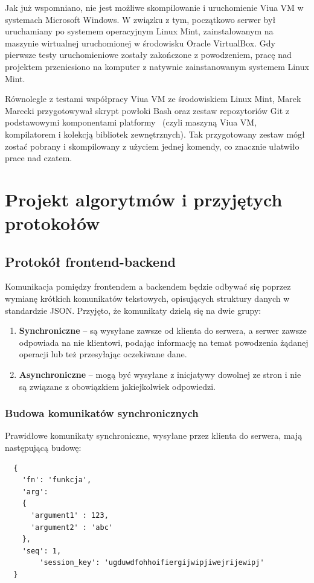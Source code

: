 Jak już wspomniano, nie jest możliwe skompilowanie i uruchomienie Viua
VM w systemach Microsoft Windows. W związku z tym, początkowo serwer był
uruchamiany po systemem operacyjnym Linux Mint, zainstalowanym na maszynie
wirtualnej uruchomionej w środowisku Oracle VirtualBox. Gdy pierwsze testy
uruchomieniowe zostały zakończone z powodzeniem, pracę nad projektem
przeniesiono na komputer z natywnie zainstanowanym systemem Linux Mint.

Równolegle z testami współpracy Viua VM ze środowiskiem Linux Mint, Marek
Marecki przygotowywał skrypt powłoki Bash oraz zestaw repozytoriów Git z
podstawowymi komponentami platformy \ViuAct\ (czyli maszyną Viua VM, kompilatorem
\ViuAct i kolekcją bibliotek zewnętrznych). Tak przygotowany zestaw mógł zostać
pobrany i skompilowany z użyciem jednej komendy, co znacznie ułatwiło prace
nad czatem.

\section{Projekt algorytmów i przyjętych protokołów}

\subsection{Protokół frontend-backend}
Komunikacja pomiędzy frontendem a backendem będzie odbywać się poprzez wymianę
krótkich komunikatów tekstowych, opisujących struktury danych w standardzie
JSON. Przyjęto, że komunikaty dzielą się na dwie grupy:

\begin{enumerate}
	\item \textbf{Synchroniczne} -- są wysyłane zawsze od klienta do serwera, a
	serwer zawsze odpowiada na nie klientowi, podając informację na temat
	powodzenia żądanej operacji lub też przesyłając oczekiwane dane.

	\item \textbf{Asynchroniczne} -- mogą być wysyłane z inicjatywy dowolnej ze
	stron i nie są związane z obowiązkiem jakiejkolwiek odpowiedzi.
\end{enumerate}

\subsubsection{Budowa komunikatów synchronicznych}
Prawidłowe komunikaty synchroniczne, wysyłane przez klienta do serwera, mają
następującą budowę:
\begin{lstlisting}
  {
    'fn': 'funkcja',
    'arg':
    {
      'argument1' : 123,
      'argument2' : 'abc'
    },
    'seq': 1,
		'session_key': 'ugduwdfohhoifiergijwipjiwejrijewipj'
  }
\end{lstlisting}

